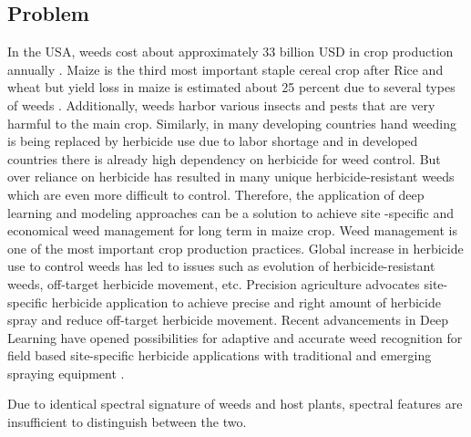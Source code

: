 \documentclass{report}
\begin{document}
\subsection{Problem}
In the USA, weeds cost about approximately 33 billion USD in  crop production annually \cite{4}. Maize is the third most important staple cereal crop after Rice and wheat but yield loss in maize is estimated about 25 percent due to several types of weeds \cite{2}. Additionally, weeds harbor various insects and pests that are very harmful to the main crop. Similarly, in many developing countries hand weeding is being replaced by herbicide use due to labor shortage and in developed countries there is already high dependency on herbicide for weed control. But over reliance on herbicide has resulted in many unique herbicide-resistant weeds which are even more difficult to control. Therefore, the application of deep learning and modeling approaches can be a solution to achieve site -specific and economical weed management for long term in maize crop.
 Weed management is one of the most important crop production practices. Global increase in herbicide use to control weeds has led to issues such as evolution of herbicide-resistant weeds, off-target herbicide movement, etc. Precision agriculture advocates site-specific herbicide application to achieve precise and right amount of herbicide spray and reduce off-target herbicide movement. Recent advancements in Deep Learning have opened possibilities for adaptive and accurate weed recognition for field based site-specific herbicide applications with traditional and emerging spraying equipment \cite{1}.\par
Due to identical spectral signature of weeds and host plants, spectral features are insufficient to distinguish between the two. 
\end{document}
